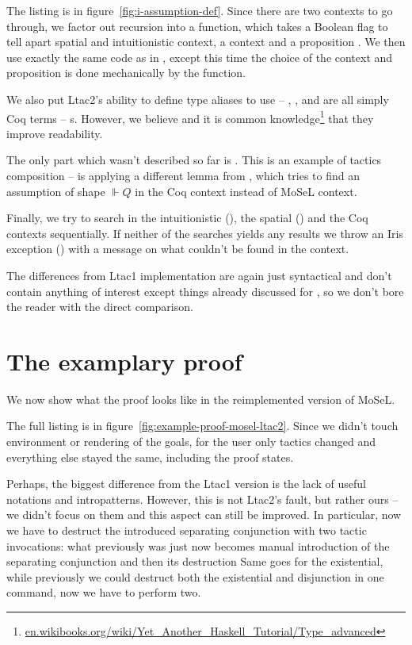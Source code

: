 The listing is in figure~\ref{fig:i-assumption-def}.
Since there are two contexts to go through, we factor out recursion into a  function, which takes a Boolean flag  to tell apart spatial and intuitionistic context, a context  and a proposition .
We then use exactly the same code as in , except this time the choice of the context and proposition is done mechanically by the  function.

We also put Ltac2's ability to define type aliases to use -- , , and  are all simply Coq terms -- s.
However, we believe and it is common knowledge\footnote{\href{https://en.wikibooks.org/wiki/Yet\_Another\_Haskell\_Tutorial/Type\_advanced}{en.wikibooks.org/wiki/Yet\_Another\_Haskell\_Tutorial/Type\_advanced}} that they improve readability.

The only part which wasn't described so far is .
This is an example of tactics composition --  is applying a different lemma from , which tries to find an assumption of shape \(\Vdash Q\) in the Coq context instead of MoSeL context.

Finally, we try to search in the intuitionistic (), the spatial () and the Coq contexts sequentially.
If neither of the searches yields any results we throw an Iris exception () with a message on what couldn't be found in the context.

The differences from Ltac1 implementation are again just syntactical and don't contain anything of interest except things already discussed for , so we don't bore the reader with the direct comparison.

\section{The examplary proof}
\label{sec:examplary-proof-in-ltac2-mosel}

We now show what the proof looks like in the reimplemented version of MoSeL.

The full listing is in figure~\ref{fig:example-proof-mosel-ltac2}.
Since we didn't touch environment or rendering of the goals, for the user only tactics changed and everything else stayed the same, including the proof states.

Perhaps, the biggest difference from the Ltac1 version is the lack of useful notations and intropatterns.
However, this is not Ltac2's fault, but rather ours -- we didn't focus on them and this aspect can still be improved.
In particular, now we have to destruct the introduced separating conjunction with two tactic invocations: what previously was just  now becomes manual introduction of the separating conjunction  and then its destruction 
Same goes for the existential, while previously we could destruct both the existential and disjunction in one command, now we have to perform two.

